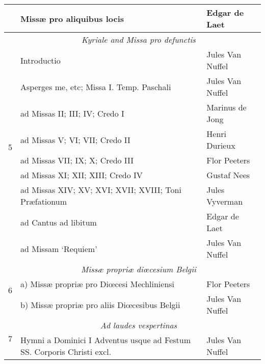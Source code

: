 \begin{table}[ht]
\begin{tabular}{@{}cll@{}}
                     & Miss\ae{} pro aliquibus locis                                          & Edgar de Laet                \\ \midrule
\multirow{10}{*}{5}  & \multicolumn{2}{c}{\textit{Kyriale and Missa pro defunctis}}                                          \\
                     & Introductio                                                            & Jules Van Nuffel             \\
                     & Asperges me, etc; Missa I. Temp. Paschali                              & Jules Van Nuffel             \\
                     & ad Missas II; III; IV; Credo I                                         & Marinus de Jong              \\
                     & ad Missas V; VI; VII; Credo II                                         & Henri Durieux                \\
                     & ad Missas VII; IX; X; Credo III                                        & Flor Peeters                 \\
                     & ad Missas XI; XII; XIII; Credo IV                                      & Gustaf Nees                  \\
                     & ad Missas XIV; XV; XVI; XVII; XVIII; Toni Pr\ae{}fationum              & Jules Vyverman               \\
                     & ad Cantus ad libitum                                                   & Edgar de Laet                \\
                     & ad Missam `Requiem'                                                    & Jules Van Nuffel             \\ \midrule
\multirow{3}{*}{6}   & \multicolumn{2}{c}{\textit{Miss\ae{} propri\ae{} di\oe{}cesium Belgii}}                               \\
                     & a) Miss\ae{} propri\ae{} pro Di\oe{}cesi Mechliniensi                  & Flor Peeters                 \\
                     & b) Miss\ae{} propri\ae{} pro aliis Di\oe{}cesibus Belgii               & Jules Van Nuffel             \\ \midrule
\multirow{8}{*}{7}   & \multicolumn{2}{c}{\textit{Ad laudes vespertinas}}                                                    \\
                     & Hymni a Dominici I Adventus usque ad Festum SS. Corporis Christi excl. & Jules Van Nuffel             \\

\end{tabular}
\end{table}
